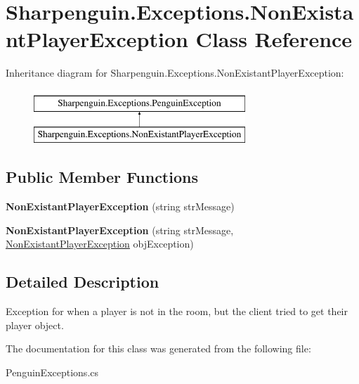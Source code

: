 \hypertarget{classSharpenguin_1_1Exceptions_1_1NonExistantPlayerException}{\section{Sharpenguin.\-Exceptions.\-Non\-Existant\-Player\-Exception Class Reference}
\label{classSharpenguin_1_1Exceptions_1_1NonExistantPlayerException}
}
Inheritance diagram for Sharpenguin.\-Exceptions.\-Non\-Existant\-Player\-Exception\-:\begin{figure}[H]
\begin{center}
\leavevmode
\includegraphics[height=2.000000cm]{classSharpenguin_1_1Exceptions_1_1NonExistantPlayerException}
\end{center}
\end{figure}
\subsection*{Public Member Functions}
\begin{DoxyCompactItemize}
\item 
\hypertarget{classSharpenguin_1_1Exceptions_1_1NonExistantPlayerException_a90511b21814b1bc2db9d2fdb1fe9aca5}{{\bfseries Non\-Existant\-Player\-Exception} (string str\-Message)}\label{classSharpenguin_1_1Exceptions_1_1NonExistantPlayerException_a90511b21814b1bc2db9d2fdb1fe9aca5}

\item 
\hypertarget{classSharpenguin_1_1Exceptions_1_1NonExistantPlayerException_a4e058a758643f7834239e6a76225afec}{{\bfseries Non\-Existant\-Player\-Exception} (string str\-Message, \hyperlink{classSharpenguin_1_1Exceptions_1_1NonExistantPlayerException}{Non\-Existant\-Player\-Exception} obj\-Exception)}\label{classSharpenguin_1_1Exceptions_1_1NonExistantPlayerException_a4e058a758643f7834239e6a76225afec}

\end{DoxyCompactItemize}


\subsection{Detailed Description}
Exception for when a player is not in the room, but the client tried to get their player object. 

The documentation for this class was generated from the following file\-:\begin{DoxyCompactItemize}
\item 
Penguin\-Exceptions.\-cs\end{DoxyCompactItemize}
